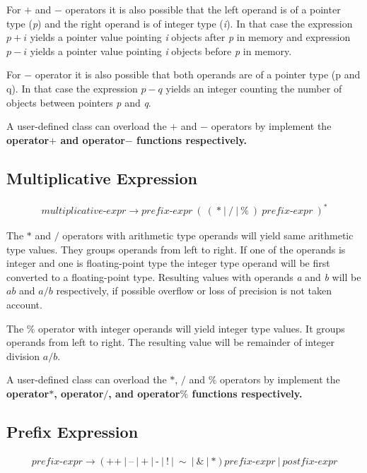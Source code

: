 \documentclass[a4paper,oneside,11pt]{article}
\begin{document}
For $+$ and $-$ operators it is also possible that the left operand is of a pointer type (\emph{p}) and the right operand is of integer type (\emph{i}).
In that case the expression $p+i$ yields a pointer value pointing \emph{i} objects after \emph{p} in memory and
expression $p-i$ yields a pointer value pointing \emph{i} objects before \emph{p} in memory.

For $-$ operator it is also possible that both operands are of a pointer type (p and q).
In that case the expression $p-q$ yields an integer counting the number of objects between pointers \emph{p} and \emph{q}.

A user-defined class can overload the $+$ and $-$ operators by implement
the \bf{operator$+$} and \bf{operator$-$} functions respectively.

\subsection{Multiplicative Expression}\label{multiplicative}

\begin{align*}
multiplicative\textrm{-}expr \rightarrow \hyperref[prefix]{prefix\textrm{-}expr} \> ( \> ( \> \texttt{*} \> | \> \texttt{/} \> | \> \texttt{\%} \>) \>
\hyperref[prefix]{prefix\textrm{-}expr} \>)^*
\end{align*}

The $*$ and $/$ operators with arithmetic type operands will yield same arithmetic type values. They groups operands from left to right.
If one of the operands is integer and one is floating-point type the integer type operand will be first converted to a floating-point type.
Resulting values with operands \emph{a} and \emph{b} will be $a b$ and $a / b$ respectively,
if possible overflow or loss of precision is not taken account.

The $\%$ operator with integer operands will yield integer type values. It groups operands from left to right.
The resulting value will be remainder of integer division $a / b$.

A user-defined class can overload the $*$, $/$ and $\%$ operators by implement the \bf{operator$*$}, \bf{operator$/$}, and \bf{operator$\%$}
functions respectively.

\subsection{Prefix Expression}\label{prefix}

\begin{align*}
prefix\textrm{-}expr \rightarrow \> ( \> \texttt{++} \> | \> \texttt{--} \> | \> \texttt{+} \> | \> \texttt{-} \> | \>
\texttt{!} \> | \> \sim \> | \> \texttt{\&} \> | \> \texttt{*} \>) \> prefix\textrm{-}expr \> | \> \hyperref[postfix]{postfix\textrm{-}expr}
\end{align*}
\end{document}
